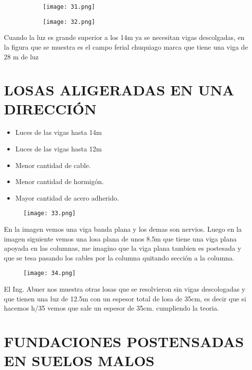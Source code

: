\begin{figure}[H]
	\begin{subfigure}{0.5\textwidth}
	\centering
	\texttt{[image: 31.png]}
	\end{subfigure}
	\begin{subfigure}{0.5\textwidth}
	\centering
	\texttt{[image: 32.png]}
	\end{subfigure}
\end{figure}

Cuando la luz es grande superior a los 14m
ya se necesitan vigas descolgadas, en la figura
que se muestra es el campo ferial chuquiago marca
que tiene una viga de 28 m de luz

\section{LOSAS ALIGERADAS EN UNA DIRECCIÓN}

\begin{itemize}
	\item Luces de las vigas hasta 14m
	\item Luces de las vigas hasta 12m
	\item Menor cantidad de cable.
	\item Menor cantidad de hormigón.
	\item Mayor cantidad de acero adherido.
\end{itemize}

\begin{figure}[H]
\centering
\texttt{[image: 33.png]}
\end{figure}

En la imagen vemos una viga banda plana y
los demas son nervios. Luego en la imagen siguiente
vemos una losa plana de unos 8.5m que tiene una viga
plana apoyada en las columnas, me imagino que la viga
plana tambien es postesada y que se tesa pasando los
cables por la columna quitando sección a la columna.

\begin{figure}[H]
\centering
\texttt{[image: 34.png]}
\end{figure}

El Ing. Abner nos muestra otras losas que se resolvieron
sin vigas descologadas y que tienen una luz de 12.5m
con un espesor total de losa de 35cm, es decir que si
hacemos h/35 vemos que sale un espesor de 35cm.
cumpliendo la teoria.

\section{FUNDACIONES POSTENSADAS EN SUELOS MALOS}

